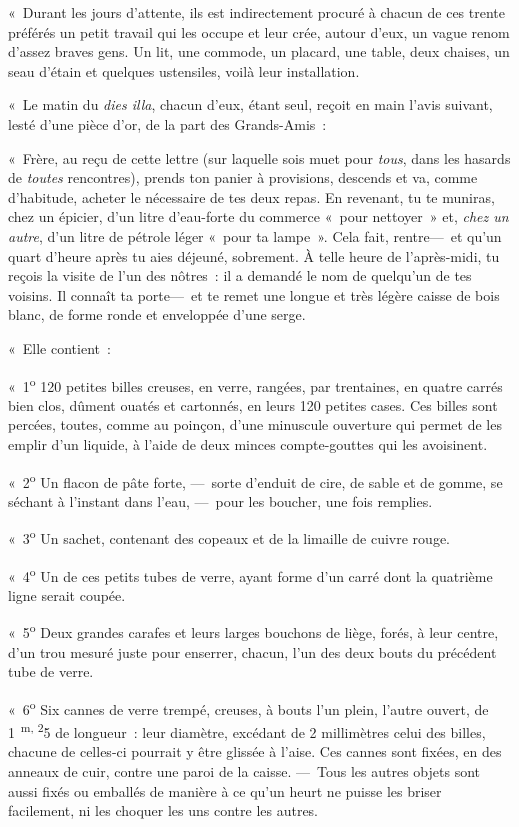 \documentclass[french,twoside]{book} %
\begin{document}
« Durant les jours d’attente, ils est indirectement procuré à chacun de ces trente préférés un petit travail qui les occupe et leur crée, autour d’eux, un vague renom d’assez braves gens. Un lit, une commode, un placard, une table, deux chaises, un seau d’étain et quelques ustensiles, voilà leur installation.\par
« Le matin du \emph{dies illa}, chacun d’eux, étant seul, reçoit en main l’avis suivant, lesté d’une pièce d’or, de la part des Grands-Amis :\par
« Frère, au reçu de cette lettre (sur laquelle sois muet pour \emph{tous}, dans les hasards de \emph{toutes} rencontres), prends ton panier à provisions, descends et va, comme d’habitude, acheter le nécessaire de tes deux repas. En revenant, tu te muniras, chez un épicier, d’un litre d’eau-forte du commerce « pour nettoyer » et, \emph{chez un autre}, d’un litre de pétrole léger « pour ta lampe ». Cela fait, rentre— et qu’un quart d’heure après tu aies déjeuné, sobrement. À telle heure de   l’après-midi, tu reçois la visite de l’un des nôtres : il a demandé le nom de quelqu’un de tes voisins. Il connaît ta porte— et te remet une longue et très légère caisse de bois blanc, de forme ronde et enveloppée d’une serge.\par
« Elle contient :\par
« 1\textsuperscript{o} 120 petites billes creuses, en verre, rangées, par trentaines, en quatre carrés bien clos, dûment ouatés et cartonnés, en leurs 120 petites cases. Ces billes sont percées, toutes, comme au poinçon, d’une minuscule ouverture qui permet de les emplir d’un liquide, à l’aide de deux minces compte-gouttes qui les avoisinent.\par
« 2\textsuperscript{o} Un flacon de pâte forte, — sorte d’enduit de cire, de sable et de gomme, se séchant à l’instant dans l’eau, — pour les boucher, une fois remplies.\par
« 3\textsuperscript{o} Un sachet, contenant des copeaux et de la limaille de cuivre rouge.\par
« 4\textsuperscript{o} Un de ces petits tubes de verre, ayant forme d’un carré dont la quatrième ligne serait coupée.\par
« 5\textsuperscript{o} Deux grandes carafes et leurs larges bouchons   de liège, forés, à leur centre, d’un trou mesuré juste pour enserrer, chacun, l’un des deux bouts du précédent tube de verre.\par
« 6\textsuperscript{o} Six cannes de verre trempé, creuses, à bouts l’un plein, l’autre ouvert, de 1\textsuperscript{ m, 2}5 de longueur : leur diamètre, excédant de 2 millimètres celui des billes, chacune de celles-ci pourrait y être glissée à l’aise. Ces cannes sont fixées, en des anneaux de cuir, contre une paroi de la caisse. — Tous les autres objets sont aussi fixés ou emballés de manière à ce qu’un heurt ne puisse les briser facilement, ni les choquer les uns contre les autres.\par
\end{document}
